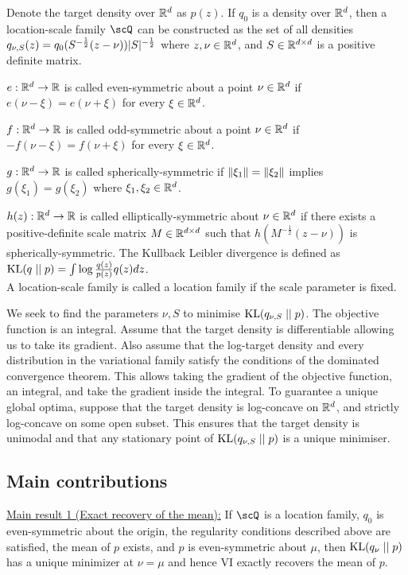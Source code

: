 \documentclass{article}
\begin{document}
Denote the target density over $\mathbb{R}^d$ as $p(z)$.
If $q_0$ is a density over $\mathbb{R}^d$, then a location-scale family $\scQ$ can be constructed as the set of all densities $q_{\nu, S}(z) = q_0(S^{-\frac{1}{2}}(z - \nu))\lvert S\rvert^{-\frac{1}{2}}$
where $z,\nu \in \mathbb{R}^d$, and $S \in \mathbb{R}^{d \times d}$ is a positive definite matrix.
\bitem
\item $e: \mathbb{R}^d \to \mathbb{R}$ is called even-symmetric about a point $\nu \in \mathbb{R}^d$ if $e(\nu - \xi) = e(\nu + \xi)$ for every $\xi \in \mathbb{R}^d$.
\item $f: \mathbb{R}^d \to \mathbb{R}$ is called odd-symmetric about a point $\nu \in \mathbb{R}^d$ if $-f(\nu - \xi) = f(\nu + \xi)$ for every $\xi \in \mathbb{R}^d$.
\item $g: \mathbb{R}^d \to \mathbb{R}$ is called spherically-symmetric if $\lt\| \xi_1 \rt\| = \lt\| \xi_2 \rt\|$ implies $g(\xi_1) = g(\xi_2)$ where $\xi_1, \xi_2 \in \mathbb{R}^d$.
\item $h(z): \mathbb{R}^d \to \mathbb{R}$ is called elliptically-symmetric about $\nu \in \mathbb{R}^d$ if there exists a positive-definite scale matrix $M \in \mathbb{R}^{d \times d}$ such that $h(M^{-\frac{1}{2}}(z-\nu))$ is spherically-symmetric.
\eitem
The Kullback Leibler divergence is defined as $\operatorname{KL}(q \; || \; p) = \int \log \frac{q(z)}{p(z)}q(z) dz$. \\
A location-scale family is called a location family if the scale parameter is fixed.

We seek to find the parameters $\nu, S$ to minimise $\operatorname{KL}(q_{\nu, S} \; || \; p)$.
The objective function is an integral.
Assume that the target density is differentiable allowing us to take its gradient.
Also assume that the log-target density and every distribution in the variational family satisfy the conditions of the dominated convergence theorem.
This allows taking the gradient of the objective function, an integral, and take the gradient inside the integral.
To guarantee a unique global optima, suppose that the target density is log-concave on $\mathbb{R}^d$, and strictly log-concave on some open subset.
This ensures that the target density is unimodal and that any stationary point of $\operatorname{KL}(q_{\nu, S} \; || \; p)$ is a unique minimiser.




\subsection{Main contributions}

\underline{Main result 1 (Exact recovery of the mean):}
If $\scQ$ is a location family, $q_0$ is even-symmetric about the origin, the regularity conditions described above are satisfied,
the mean of $p$ exists, and $p$ is even-symmetric about $\mu$,
then $\operatorname{KL}(q_\nu \; || \; p)$ has a unique minimizer at $\nu = \mu$ and hence VI exactly recovers the mean of $p$.
\end{document}
